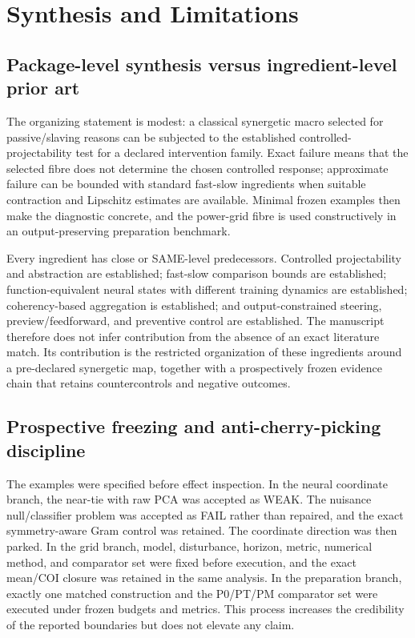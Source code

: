 \section{Synthesis and Limitations}

\subsection{Package-level synthesis versus ingredient-level prior art}

The organizing statement is modest: a classical synergetic macro selected for passive/slaving reasons can be subjected to the established controlled-projectability test for a declared intervention family. Exact failure means that the selected fibre does not determine the chosen controlled response; approximate failure can be bounded with standard fast-slow ingredients when suitable contraction and Lipschitz estimates are available. Minimal frozen examples then make the diagnostic concrete, and the power-grid fibre is used constructively in an output-preserving preparation benchmark.

Every ingredient has close or SAME-level predecessors. Controlled projectability and abstraction are established; fast-slow comparison bounds are established; function-equivalent neural states with different training dynamics are established; coherency-based aggregation is established; and output-constrained steering, preview/feedforward, and preventive control are established. The manuscript therefore does not infer contribution from the absence of an exact literature match. Its contribution is the restricted organization of these ingredients around a pre-declared synergetic map, together with a prospectively frozen evidence chain that retains countercontrols and negative outcomes.

\subsection{Prospective freezing and anti-cherry-picking discipline}

The examples were specified before effect inspection. In the neural coordinate branch, the near-tie with raw PCA was accepted as WEAK. The nuisance null/classifier problem was accepted as FAIL rather than repaired, and the exact symmetry-aware Gram control was retained. The coordinate direction was then parked. In the grid branch, model, disturbance, horizon, metric, numerical method, and comparator set were fixed before execution, and the exact mean/COI closure was retained in the same analysis. In the preparation branch, exactly one matched construction and the P0/PT/PM comparator set were executed under frozen budgets and metrics. This process increases the credibility of the reported boundaries but does not elevate any claim.

